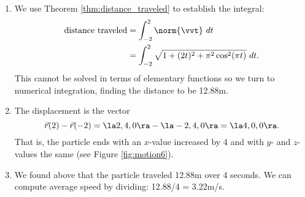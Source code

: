 {\begin{enumerate}
	\item We use Theorem \ref{thm:distance_traveled} to establish the integral:
	\begin{align*}
	\text{distance traveled} &= \int_{-2}^2 \norm{\vvt}\ dt \\
							&= \int_{-2}^2 \sqrt{1+(2t)^2+ \pi^2\cos^2(\pi t)}\ dt.
	\end{align*}
	This cannot be solved in terms of elementary functions so we turn to numerical integration, finding the distance to be 12.88m.
	
	\item		The displacement is the vector $$\vec r(2)-\vec r(-2) = \la 2,4,0\ra - \la -2,4,0\ra = \la 4,0,0\ra.$$ That is, the particle ends with an $x$-value increased by 4 and with $y$- and $z$-values the same (see Figure \ref{fig:motion6}).
	
	\item		We found above that the particle traveled 12.88m over 4 seconds. We can compute average speed by dividing: 12.88/4 = 3.22m/s. 
	

\end{enumerate}}
